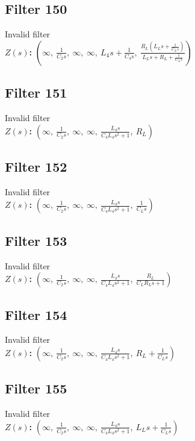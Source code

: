 \documentclass{article}
\begin{document}
\subsection*{Filter 150}
Invalid filter \\ 
\textbf{$Z(s)$:} $\left( \infty, \  \frac{1}{C_{2} s}, \  \infty, \  \infty, \  L_{4} s + \frac{1}{C_{4} s}, \  \frac{R_{L} \left(L_{L} s + \frac{1}{C_{L} s}\right)}{L_{L} s + R_{L} + \frac{1}{C_{L} s}}\right)$ \\ 
\subsection*{Filter 151}
Invalid filter \\ 
\textbf{$Z(s)$:} $\left( \infty, \  \frac{1}{C_{2} s}, \  \infty, \  \infty, \  \frac{L_{4} s}{C_{4} L_{4} s^{2} + 1}, \  R_{L}\right)$ \\ 
\subsection*{Filter 152}
Invalid filter \\ 
\textbf{$Z(s)$:} $\left( \infty, \  \frac{1}{C_{2} s}, \  \infty, \  \infty, \  \frac{L_{4} s}{C_{4} L_{4} s^{2} + 1}, \  \frac{1}{C_{L} s}\right)$ \\ 
\subsection*{Filter 153}
Invalid filter \\ 
\textbf{$Z(s)$:} $\left( \infty, \  \frac{1}{C_{2} s}, \  \infty, \  \infty, \  \frac{L_{4} s}{C_{4} L_{4} s^{2} + 1}, \  \frac{R_{L}}{C_{L} R_{L} s + 1}\right)$ \\ 
\subsection*{Filter 154}
Invalid filter \\ 
\textbf{$Z(s)$:} $\left( \infty, \  \frac{1}{C_{2} s}, \  \infty, \  \infty, \  \frac{L_{4} s}{C_{4} L_{4} s^{2} + 1}, \  R_{L} + \frac{1}{C_{L} s}\right)$ \\ 
\subsection*{Filter 155}
Invalid filter \\ 
\textbf{$Z(s)$:} $\left( \infty, \  \frac{1}{C_{2} s}, \  \infty, \  \infty, \  \frac{L_{4} s}{C_{4} L_{4} s^{2} + 1}, \  L_{L} s + \frac{1}{C_{L} s}\right)$ \\ 
\end{document}
